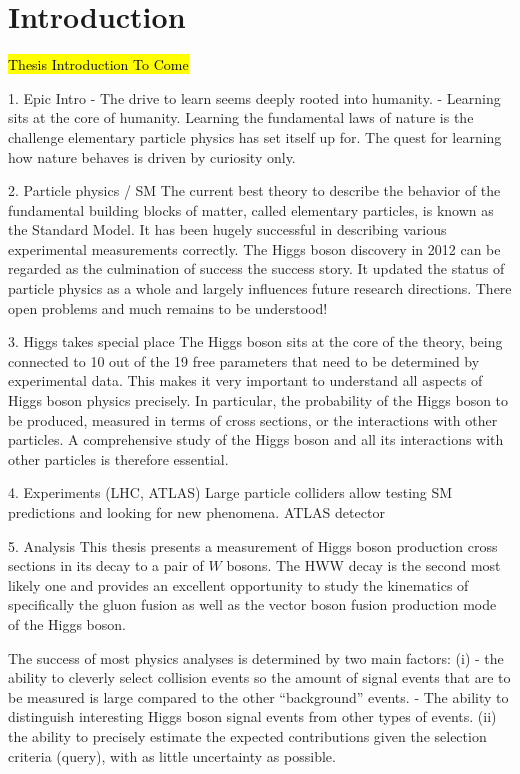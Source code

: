 \chapter{Introduction}
\label{chap:introduction}


\hl{Thesis Introduction To Come}



1. Epic Intro
- The drive to learn seems deeply rooted into humanity. 
- Learning sits at the core of humanity. 
 Learning the fundamental laws of nature is the challenge elementary particle physics has set itself up for. 
The quest for learning how nature behaves is driven by curiosity only. 

2. Particle physics / SM
The current best theory to describe the behavior of the fundamental building blocks of matter, called elementary particles, is known as the Standard Model. 
It has been hugely successful in describing various experimental measurements correctly. 
The Higgs boson discovery in 2012 can be regarded as the culmination of success the success story. 
It updated the status of particle physics as a whole and largely influences future research directions. 
There open problems and much remains to be understood!

3. Higgs takes special place
The Higgs boson sits at the core of the theory, being connected to 10 out of the 19 free parameters that need to be determined by experimental data.  
This makes it very important to understand all aspects of Higgs boson physics precisely. In particular, the probability of the Higgs boson to be produced, measured in terms of cross sections, or the interactions with other particles.
A comprehensive study of the Higgs boson and all its interactions with other particles is therefore essential. 

4. Experiments (LHC,  ATLAS)
Large particle colliders allow testing SM predictions and looking for new phenomena. 
ATLAS detector

5. Analysis 
This thesis presents a measurement of Higgs boson production cross sections in its decay to a pair of $W$ bosons. 
The HWW decay is the second most likely one and provides an excellent opportunity to study the kinematics of specifically the gluon fusion as well as the vector boson fusion production mode of the Higgs boson.

The success of most physics analyses is determined by two main factors: 
(i) 
- the ability to cleverly select collision events so the amount of signal events that are to be measured is large compared to the other ``background'' events.  
- The ability to distinguish interesting Higgs boson signal events from other types of events.
(ii) the ability to precisely estimate the expected contributions given the selection criteria (query), with as little uncertainty as possible.

